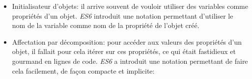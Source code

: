 \begin{itemize}
\begin{Shaded}
\begin{Highlighting}[]
  \OperatorTok{=} \OperatorTok{,} \OperatorTok{=} \NormalTok{) }\OperatorTok{\{}
     \OperatorTok{+} 
\OperatorTok{\};}
  \OperatorTok{,} \OperatorTok{\{}
     \OperatorTok{===} \NormalTok{)}
        \OperatorTok{=} \OperatorTok{;}
     \OperatorTok{===} \NormalTok{)}
        \OperatorTok{=} \OperatorTok{;}
     \OperatorTok{+} \OperatorTok{;}
\OperatorTok{\};}
\end{Highlighting}
\end{Shaded}
\item
  Initialisateur d'objets: il arrive souvent de vouloir utiliser des
  variables comme propriétés d'un objet. \emph{ES6} introduit une
  notation permettant d'utiliser le nom de la variable comme nom de la
  propriété de l'objet créé.

\begin{Shaded}
\begin{Highlighting}[]
\OperatorTok{=} \OperatorTok{\{} \OperatorTok{,} \OperatorTok{\}}
\OperatorTok{=} \OperatorTok{\{} \OperatorTok{:} \OperatorTok{,} \OperatorTok{:} \OperatorTok{\};}
\end{Highlighting}
\end{Shaded}
\item
  Affectation par décomposition: pour accéder aux valeurs des propriétés
  d'un objet, il fallait pour cela itérer sur ces propriétés, ce qui
  était fastidieux et gourmand en lignes de code. \emph{ES6} a introduit
  une notation permettant de faire cela facilement, de façon compacte et
  implicite:

\begin{Shaded}
\begin{Highlighting}[]
 \OperatorTok{\{} \OperatorTok{,} \OperatorTok{,} \OperatorTok{\}} \OperatorTok{=} \NormalTok{()}

 \OperatorTok{=} \NormalTok{()}\OperatorTok{;}
 \OperatorTok{=} \OperatorTok{;}
 \OperatorTok{=} \OperatorTok{;}
 \OperatorTok{=} \OperatorTok{;}
\end{Highlighting}
\end{Shaded}
\end{itemize}


